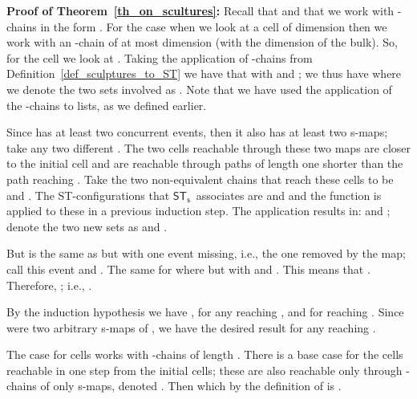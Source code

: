 \documentclass[submission,copyright,creativecommons]{eptcs}
\newenvironment{proof}[1][\!\!\,]{\vspace{1ex}\noindent\textbf{Proof #1: }}{\hfill\vspace{2ex}}
\newcommand{\cp}[1]{}
\newcounter{case}
\newcommand\HDA{\ensuremath{\mathit{HDA}}}
\newcommand\HDAs{\ensuremath{\mathit{HDAs}}}
\newcommand\sculpintost{\ensuremath{\mathsf{ST}_{\!\mathsf{s}}}}
\begin{document}
\begin{proof}[of Theorem~\ref{th_on_scultures}]
Recall that  and that we work with -chains in the form . For the case when we look at a cell of dimension  then we work with an -chain of at most dimension  (with  the dimension of the bulk). So, for the cell  we look at . Taking the application of -chains from Definition~\ref{def_sculptures_to_ST} we have that  with  and ; we thus have  where we denote the two sets involved as . Note that we have used the application of the -chains to lists, as we defined earlier.

Since  has at least two concurrent events, then it also has at least two s-maps; take any two different . The two cells reachable through these two maps are closer to the initial cell and are reachable through paths of length one shorter than the path reaching . Take the two non-equivalent chains that reach these cells to be  and . The ST-configurations that \sculpintost\ associates are  and  and the function  is applied to these in a previous induction step. The application results in:  and ; denote the two new sets as  and .

But  is the same as  but with one event missing, i.e., the one removed by the  map; call this event  and . The same for  where  but with  and . This means that . Therefore, ; i.e., .

By the induction hypothesis we have , for any  reaching , and  for  reaching . Since  were two arbitrary s-maps of , we have the desired result  for any  reaching .

The case for cells  works with -chains of length .
There is a base case for the cells  reachable in one step from the initial cells; these are also reachable only through -chains of only s-maps, denoted . Then  which by the definition of  is .
\end{proof}

\cp{
Can I give results relating the sculptures with configuration deterministic and configuration unique and configuration preserving properties on \HDAs\ as given by van Glabbeek?

Looks like the following:
\begin{enumerate}
\item All sculptures are configuration preserving.
\item All sculptures are configuration deterministic.
Are there \HDAs\ that are configuration deterministic, or configuration preserving but are not sculptures?
\item The example of the interleaving square as a \HDA\ is not configuration unique. But if we see it as a sculpture and take events as equivalence classes from the bulk then it becomes configuration unique.
\end{enumerate}

}
\end{document}
